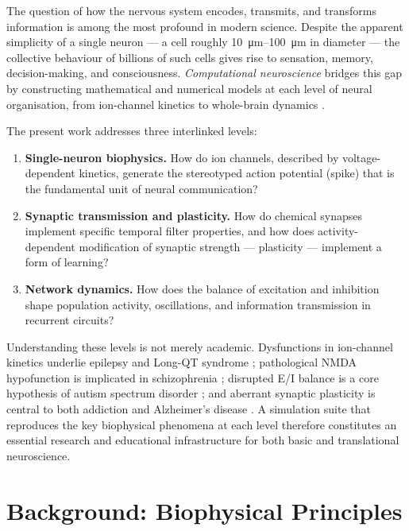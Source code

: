 \documentclass[11pt, a4paper, twocolumn]{article}
\begin{document}
The question of how the nervous system encodes, transmits, and transforms
information is among the most profound in modern science. Despite the apparent
simplicity of a single neuron --- a cell roughly \SIrange{10}{100}{\micro\metre}
in diameter --- the collective behaviour of billions of such cells gives rise
to sensation, memory, decision-making, and consciousness. \emph{Computational
neuroscience} bridges this gap by constructing mathematical and numerical
models at each level of neural organisation, from ion-channel kinetics to
whole-brain dynamics \citep{Dayan2001}.

The present work addresses three interlinked levels:
\begin{enumerate}[leftmargin=1.2em, itemsep=2pt]
  \item \textbf{Single-neuron biophysics.} How do ion channels, described by
    voltage-dependent kinetics, generate the stereotyped action potential
    (spike) that is the fundamental unit of neural communication?
  \item \textbf{Synaptic transmission and plasticity.} How do chemical
    synapses implement specific temporal filter properties, and how does
    activity-dependent modification of synaptic strength --- plasticity ---
    implement a form of learning?
  \item \textbf{Network dynamics.} How does the balance of excitation and
    inhibition shape population activity, oscillations, and information
    transmission in recurrent circuits?
\end{enumerate}

Understanding these levels is not merely academic. Dysfunctions in ion-channel
kinetics underlie epilepsy and Long-QT syndrome \citep{Bhatt2009}; pathological
NMDA hypofunction is implicated in schizophrenia \citep{Coyle2006}; disrupted
E/I balance is a core hypothesis of autism spectrum disorder
\citep{Yizhar2011}; and aberrant synaptic plasticity is central to both
addiction and Alzheimer's disease \citep{Bhatt2009}. A simulation suite that
reproduces the key biophysical phenomena at each level therefore constitutes
an essential research and educational infrastructure for both basic and
translational neuroscience.

\section{Background: Biophysical Principles}
\label{sec:background}
\end{document}
